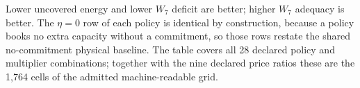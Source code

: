 \par\footnotesize Lower uncovered energy and lower $W_7$ deficit are better; higher $W_7$ adequacy is better. The $\eta=0$ row of each policy is identical by construction, because a policy books no extra capacity without a commitment, so those rows restate the shared no-commitment physical baseline. The table covers all 28 declared policy and multiplier combinations; together with the nine declared price ratios these are the 1{,}764 cells of the admitted machine-readable grid.
